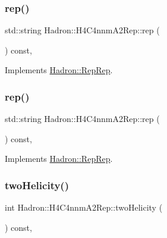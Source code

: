 \subsubsection{\texorpdfstring{rep()}{rep()}\hspace{0.1cm}{\footnotesize\ttfamily [4/5]}}
{\footnotesize\ttfamily std\+::string Hadron\+::\+H4\+C4nnm\+A2\+Rep\+::rep (\begin{DoxyParamCaption}{ }\end{DoxyParamCaption}) const\hspace{0.3cm}{\ttfamily [inline]}, {\ttfamily [virtual]}}



Implements \mbox{\hyperlink{structHadron_1_1RepRep_ab3213025f6de249f7095892109575fde}{Hadron\+::\+Rep\+Rep}}.

\mbox{\label{structHadron_1_1H4C4nnmA2Rep_a8a7be6ed1396d06723b3d7891b6ab5a8}} 
\subsubsection{\texorpdfstring{rep()}{rep()}\hspace{0.1cm}{\footnotesize\ttfamily [5/5]}}
{\footnotesize\ttfamily std\+::string Hadron\+::\+H4\+C4nnm\+A2\+Rep\+::rep (\begin{DoxyParamCaption}{ }\end{DoxyParamCaption}) const\hspace{0.3cm}{\ttfamily [inline]}, {\ttfamily [virtual]}}



Implements \mbox{\hyperlink{structHadron_1_1RepRep_ab3213025f6de249f7095892109575fde}{Hadron\+::\+Rep\+Rep}}.

\mbox{\label{structHadron_1_1H4C4nnmA2Rep_ab2b49f0e189eae4dc52cb9ab1d7f9b11}} 
\subsubsection{\texorpdfstring{twoHelicity()}{twoHelicity()}\hspace{0.1cm}{\footnotesize\ttfamily [1/3]}}
{\footnotesize\ttfamily int Hadron\+::\+H4\+C4nnm\+A2\+Rep\+::two\+Helicity (\begin{DoxyParamCaption}{ }\end{DoxyParamCaption}) const\hspace{0.3cm}{\ttfamily [inline]}, {\ttfamily [virtual]}}

